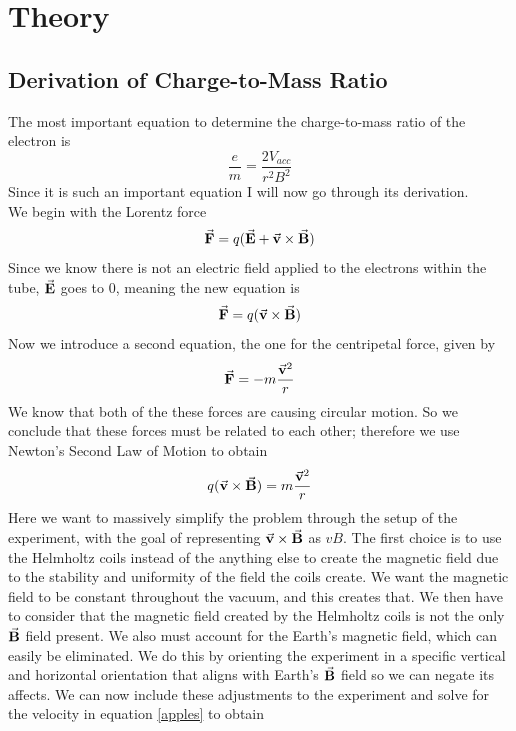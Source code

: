 \documentclass[aps,prl,10pt,twocolumn,floatfix]{revtex4-2}
\begin{document}
\section{Theory}\label{Theory}
\subsection{Derivation of Charge-to-Mass Ratio}
The most important equation to determine the charge-to-mass ratio of the electron is
\begin{equation}\label{pears}
\frac{e}{m}=\frac{2V_{acc}}{r^2B^2}
\end{equation}
Since it is such an important equation I will now go through its derivation. \\
We begin with the Lorentz force
\begin{equation}
\va{F}=q(\va{E}+\va{v}\times \va{B})
\end{equation}
Since we know there is not an electric field applied to the electrons within the tube, $\va{E}$ goes to 0, meaning the new equation is
\begin{equation*}
\va{F}=q(\va{v}\times \va{B})
\end{equation*}
Now we introduce a second equation, the one for the centripetal force, given by
\begin{equation*}
\va{F}=-m\frac{\va{v}^2}{r}
\end{equation*}
We know that both of the these forces are causing circular motion.
So we conclude that these forces must be related to each other;
therefore we use Newton's Second Law of Motion to obtain
\begin{equation}\label{apples}
q(\va{v}\times \va{B})=m\frac{\va{v}^2}{r}
\end{equation}
Here we want to massively simplify the problem through the setup of the experiment, with the goal of representing $\va{v}\times \va{B}$ as $vB$.
The first choice is to use the Helmholtz coils instead of the anything else to create the magnetic field due to the stability and uniformity of the field the coils create.
We want the magnetic field to be constant throughout the vacuum, and this creates that.
We then have to consider that the magnetic field created by the Helmholtz coils is not the only $\va{B}$ field present.
We also must account for the Earth's magnetic field, which can easily be eliminated.
We do this by orienting the experiment in a specific vertical and horizontal orientation that aligns with Earth's $\va{B}$ field so we can negate its affects.
We can now include these adjustments to the experiment and solve for the velocity in equation \ref{apples} to obtain
\end{document}
